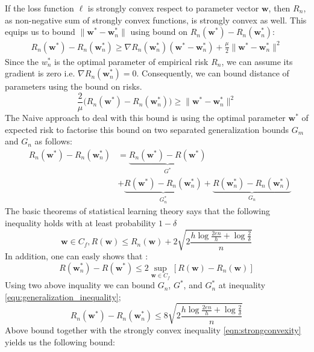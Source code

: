 \documentclass[11pt, a4paper, reqno, twoside]{scrartcl}
\theoremstyle{style}
\newcommand{\wv}{\bm{w}}
\newcommand{\0}{\mathbf{0}} %
\begin{document}
 If the loss function $\ell$ is strongly convex respect to parameter
 vector $\wv$, then $R_n$, as non-negative sum of strongly convex functions, is
 strongly convex as well. This equips us to bound $\|\wv^* - \wv_n^*\| $
 using bound on $R_n(\wv^*) - R_n(\wv_n^*)$: 
 \begin{eqnarray}
 	R_n(\wv^*) - R_n(\wv_n^*) \geq \nabla R_n(\wv_n^*) (\wv^* - \wv_n^*)
 	+\frac{\mu}{2} \|\wv^* - \wv_n^* \|^2 \nonumber
 \end{eqnarray}
 Since the $w_n^*$ is the optimal parameter of empirical risk $R_n$, we can
 assume its gradient is zero i.e. $\nabla R_n(\wv_n^*) = 0$. Consequently, we
 can bound distance of parameters using the bound on risks. 
 \begin{equation}
 	\frac{2}{\mu}\bigg(R_n(\wv^*) - R_n(\wv_n^*)\bigg) \geq  \|\wv^* - \wv_n^*
 	\|^2 \label{eqn:strongconvexity}
 \end{equation}
 The Naive approach to deal with this bound is using the optimal parameter
 $\wv^*$ of expected risk to factorise this bound on two separated
 generalization bounds $G_m$ and $G_n$ as follows:
 \begin{eqnarray}
  & R_n(\wv^*) - R_n(\wv_n^*) & = \underbrace{R_n(\wv^*) - R(\wv^*)}_{G^*}
  \nonumber \\ 
  & & + \underbrace{R(\wv^*) - R_n(\wv_n^*)}_{G_n^*}  + \underbrace{R(\wv_n^*) -
  R_n(\wv_n^*)}_{G_n}\label{equ:generalization_inequality}
 \end{eqnarray}
 The basic theorems of statistical learning theory says that the following
 inequality holds with at least probability $1 - \delta$
 \begin{equation}
 	\wv \in C_f, R(\wv) \leq R_n(\wv) + 2 \sqrt{2 \frac{h \log \frac{2e
 	n}{h} + \log \frac{2}{\delta}}{n}} \nonumber
 \end{equation}
In addition, one can easly shows that \cite{bousquet2004introduction}: 
\begin{equation}
	R(\wv_n^*) -  R(\wv^*) \leq 2 \sup_{\wv \in C_f}[R(\wv) - R_n(\wv)] \nonumber
\end{equation}
Using two above inquality we can bound $G_n$, $G^*$, and $G_n^*$ at inequality
\ref{equ:generalization_inequality}; 
\begin{equation}
	R_n(\wv^*) - R_n(\wv_n^*) \leq 8 \sqrt{2 \frac{h \log \frac{2e
 	n}{h} + \log \frac{2}{\delta}}{n}}	\nonumber
\end{equation}
Above bound together with the strongly convex inequality
\ref{eqn:strongconvexity} yields us the following bound: 
\end{document}
